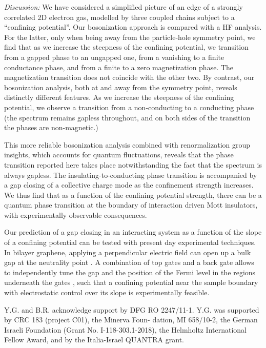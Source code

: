 \documentclass[twocolumn, prl, aps, floatfix, superscriptaddress, longbibliography]{revtex4-1}
\begin{document}
\noindent \textit{Discussion:} 
We have considered a simplified picture of an edge of a strongly correlated 2D electron gas, modelled by three coupled chains subject to a “confining potential”. Our bosonization approach is compared with a HF analysis. For the latter, only when being away from the particle-hole symmetry point, we find that as we increase the steepness of the confining potential, we transition from a gapped phase to an ungapped one, from a vanishing to a finite conductance phase, and from a finite to a  zero magnetization phase. The magnetization transition does not coincide with the other two. By contrast, our bosonization analysis, both at and away from the symmetry point, reveals distinctly different features.  As we increase the steepness of the confining potential, we observe a transition from a non-conducting to a conducting phase (the spectrum remains  gapless throughout, and on both sides of the transition the phases are non-magnetic.)

This more reliable bosonization analysis combined with renormalization group insights, which accounts for quantum fluctuations, reveals that the phase transition reported here takes place notwithstanding the fact that the spectrum is always gapless. The insulating-to-conducting phase transition is accompanied by a gap closing of a collective charge mode as the confinement strength increases.
We thus find that as a function of the confining potential strength, there can be a quantum phase transition at the boundary of interaction driven Mott insulators, with experimentally observable consequences. 

Our prediction of a gap closing in an interacting system as a function of the slope of a confining potential can  be tested with present day experimental techniques.  In bilayer graphene, applying a perpendicular electric field can open up a bulk gap at the neutrality point  \cite{Li.2018}.  A combination of 
 top gates and a back gate allows to independently tune the gap and the position of the Fermi level in the regions underneath the gates 
 \cite{Overweg.2018}, such that a confining potential near the sample boundary with electrostatic control over its  slope is experimentally feasible. 
 
 
 
\acknowledgements
Y.G. and B.R. acknowledge support by DFG RO 2247/11-1.   Y.G. was supported by CRC 183 (project C01), the Minerva Foun-
dation, MI 658/10-2, the
German Israeli Foundation (Grant No. I-118-303.1-2018),
the Helmholtz International Fellow Award, and by the
Italia-Israel QUANTRA grant.
\end{document}
